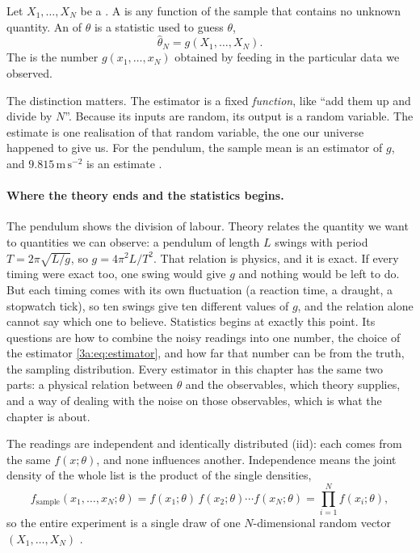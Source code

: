 \begin{workdef}
Let $X_1,\dots,X_N$ be a  . A  is any function of the
sample that contains no unknown quantity. An  of $\theta$ is
a statistic used to guess $\theta$,
\begin{equation}
  \hat\theta_N=g(X_1,\dots,X_N).
  \label{3a:eq:estimator}
\end{equation}
The  is the number $g(x_1,\dots,x_N)$ obtained by feeding in
the particular data we observed.
\end{workdef}

The distinction matters. The estimator is a fixed \emph{function}, like
``add them up and divide by $N$''. Because its inputs are random, its output
is a random variable. The estimate is one realisation of that random variable,
the one our universe happened to give us. For the pendulum, the sample mean is
an estimator of $g$, and $9.815\,\mathrm{m\,s^{-2}}$ is an estimate
.

\paragraph{Where the theory ends and the statistics begins.}
The pendulum shows the division of labour. Theory relates the quantity we
want to quantities we can observe: a pendulum of length $L$ swings with period
$T=2\pi\sqrt{L/g}$, so $g=4\pi^2L/T^2$. That relation is physics, and it is
exact. If every timing were exact too, one swing would give $g$ and nothing
would be left to do. But each timing comes with its own fluctuation (a
reaction time, a draught, a stopwatch tick), so ten swings give ten different
values of $g$, and the relation alone cannot say which one to believe.
Statistics begins at exactly this point. Its questions are how to combine the
noisy readings into one number, the choice of the estimator
\eqref{3a:eq:estimator}, and how far
that number can be from the truth, the sampling distribution. Every
estimator in this chapter has the same two parts: a physical relation between
$\theta$ and the observables, which theory supplies, and a way of dealing with
the noise on those observables, which is what the chapter is about.

The readings are independent and identically distributed (iid): each comes
from the same $f(x;\theta)$, and none influences another. Independence means
the joint density of the whole list is the product of the single densities,
\begin{equation}
  f_{\text{sample}}(x_1,\dots,x_N;\theta)=f(x_1;\theta)\,f(x_2;\theta)\cdots f(x_N;\theta)
  =\prod_{i=1}^N f(x_i;\theta),
  \label{3a:eq:joint-sample}
\end{equation}
so the entire experiment is a single draw of one $N$-dimensional random
vector $(X_1,\dots,X_N)$ .

